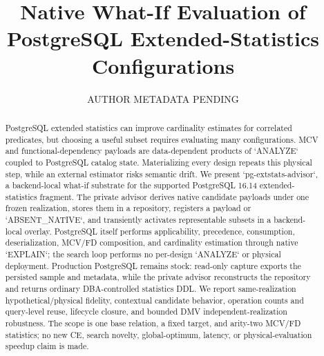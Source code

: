 \documentclass[sigconf,nonacm]{acmart}
\begin{document}
\title{Native What-If Evaluation of PostgreSQL Extended-Statistics Configurations}
\author{AUTHOR METADATA PENDING}

\begin{abstract}
PostgreSQL extended statistics can improve cardinality estimates for correlated
predicates, but choosing a useful subset requires evaluating many
configurations. MCV and functional-dependency payloads are data-dependent
products of `ANALYZE` coupled to PostgreSQL catalog state. Materializing every
design repeats this physical step, while an external estimator risks semantic
drift. We present `pg-extstats-advisor`, a backend-local what-if substrate for
the supported PostgreSQL 16.14 extended-statistics fragment. The private
advisor derives native candidate payloads under one frozen realization, stores
them in a repository, registers a payload or `ABSENT\_NATIVE`, and transiently
activates representable subsets in a backend-local overlay. PostgreSQL itself
performs applicability, precedence, consumption, deserialization, MCV/FD
composition, and cardinality estimation through native `EXPLAIN`; the search
loop performs no per-design `ANALYZE` or physical deployment. Production
PostgreSQL remains stock: read-only capture exports the persisted sample and
metadata, while the private advisor reconstructs the repository and returns
ordinary DBA-controlled statistics DDL. We report same-realization
hypothetical/physical fidelity, contextual candidate behavior, operation
counts and query-level reuse, lifecycle closure, and bounded DMV
independent-realization robustness. The scope is one base relation, a fixed target, and arity-two MCV/FD
statistics; no new CE, search novelty, global-optimum, latency, or
physical-evaluation speedup claim is made.
\end{abstract}
\maketitle
\vldbtopmatter














\end{document}
